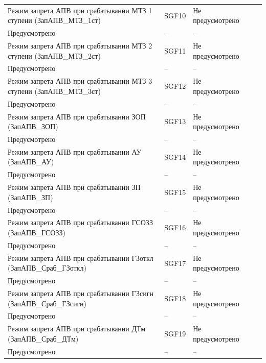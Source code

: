 \begin{longtable}{|>{\centering\arraybackslash}m{5.3cm}|>{\centering\arraybackslash}m{3.3cm}|>{\centering\arraybackslash}m{4.2cm}|>{\centering\arraybackslash}m{1.8cm}|>{\centering\arraybackslash}m{1cm}|}
\hline
\centering Режим запрета АПВ при срабатывании МТЗ 1 ступени (ЗапАПВ\_МТЗ\_1ст)  & \centering SGF10 & \centering Не предусмотрено \\ Предусмотрено & \centering -- & \centering \arraybackslash -- \\
\hline
\centering Режим запрета АПВ при срабатывании МТЗ 2 ступени (ЗапАПВ\_МТЗ\_2ст)  & \centering SGF11 & \centering Не предусмотрено \\ Предусмотрено & \centering -- & \centering \arraybackslash -- \\
\hline
\centering Режим запрета АПВ при срабатывании МТЗ 3 ступени (ЗапАПВ\_МТЗ\_3ст)  & \centering SGF12 & \centering Не предусмотрено \\ Предусмотрено & \centering -- & \centering \arraybackslash -- \\
\hline
\centering Режим запрета АПВ при срабатывании ЗОП (ЗапАПВ\_ЗОП)  & \centering SGF13 & \centering Не предусмотрено \\ Предусмотрено & \centering -- & \centering \arraybackslash -- \\
\hline
\centering Режим запрета АПВ при срабатывании АУ (ЗапАПВ\_АУ)  & \centering SGF14 & \centering Не предусмотрено \\ Предусмотрено & \centering -- & \centering \arraybackslash -- \\
\hline
\centering Режим запрета АПВ при срабатывании ЗП (ЗапАПВ\_ЗП)  & \centering SGF15 & \centering Не предусмотрено \\ Предусмотрено & \centering -- & \centering \arraybackslash -- \\
\hline
\centering Режим запрета АПВ при срабатывании ГСОЗЗ (ЗапАПВ\_ГСОЗЗ)  & \centering SGF16 & \centering Не предусмотрено \\ Предусмотрено & \centering -- & \centering \arraybackslash -- \\
\hline
\centering Режим запрета АПВ при срабатывании ГЗоткл (ЗапАПВ\_Сраб\_ГЗоткл)  & \centering SGF17 & \centering Не предусмотрено \\ Предусмотрено & \centering -- & \centering \arraybackslash -- \\
\hline
\centering Режим запрета АПВ при срабатывании ГЗсигн (ЗапАПВ\_Сраб\_ГЗсигн)  & \centering SGF18 & \centering Не предусмотрено \\ Предусмотрено & \centering -- & \centering \arraybackslash -- \\
\hline
\centering Режим запрета АПВ при срабатывании ДТм (ЗапАПВ\_Сраб\_ДТм)  & \centering SGF19 & \centering Не предусмотрено \\ Предусмотрено & \centering -- & \centering \arraybackslash -- \\

\end{longtable}
